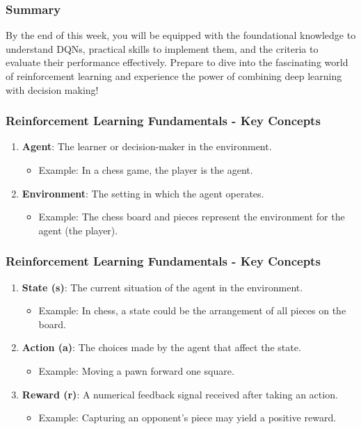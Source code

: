 \documentclass{beamer}
\begin{document}
\begin{frame}[fragile]
    \frametitle{Summary}
    By the end of this week, you will be equipped with the foundational knowledge to understand DQNs, practical skills to implement them, and the criteria to evaluate their performance effectively. Prepare to dive into the fascinating world of reinforcement learning and experience the power of combining deep learning with decision making!
\end{frame}

\begin{frame}[fragile]
    \frametitle{Reinforcement Learning Fundamentals - Key Concepts}
    \begin{enumerate}
        \item \textbf{Agent}: The learner or decision-maker in the environment.
        \begin{itemize}
            \item Example: In a chess game, the player is the agent.
        \end{itemize}
        
        \item \textbf{Environment}: The setting in which the agent operates.
        \begin{itemize}
            \item Example: The chess board and pieces represent the environment for the agent (the player).
        \end{itemize}
    \end{enumerate}
\end{frame}

\begin{frame}[fragile]
    \frametitle{Reinforcement Learning Fundamentals - Key Concepts}
    \begin{enumerate}[resume]
        \item \textbf{State (s)}: The current situation of the agent in the environment.
        \begin{itemize}
            \item Example: In chess, a state could be the arrangement of all pieces on the board.
        \end{itemize}
        
        \item \textbf{Action (a)}: The choices made by the agent that affect the state.
        \begin{itemize}
            \item Example: Moving a pawn forward one square.
        \end{itemize}
        
        \item \textbf{Reward (r)}: A numerical feedback signal received after taking an action.
        \begin{itemize}
            \item Example: Capturing an opponent's piece may yield a positive reward.
        \end{itemize}
    \end{enumerate}
\end{frame}
\end{document}
